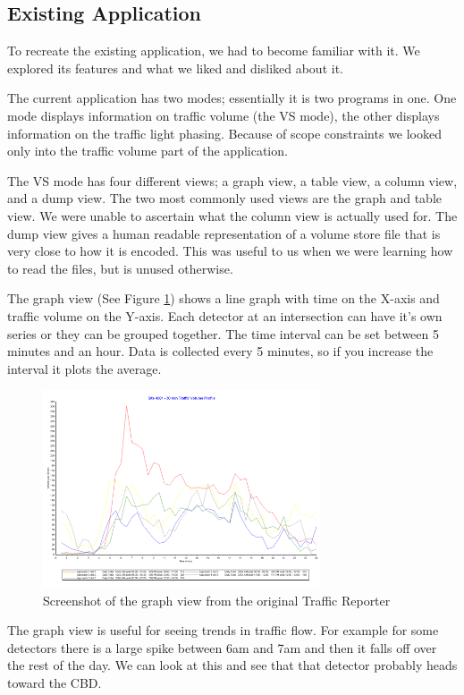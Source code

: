\documentclass{article}
\begin{document}
\subsection{Existing Application}
To recreate the existing application, we had to become
familiar with it. We explored its features and what we liked
and disliked about it.

The current application has two modes; essentially it is two
programs in one. One mode displays information on traffic
volume (the VS mode), the other displays information on the
traffic light phasing. Because of scope constraints we looked
only into the traffic volume part of the application. 

The VS mode has four different views; a graph view, a
table view, a column view, and a dump view. The two most
commonly used views are the graph and table view. We were
unable to ascertain what the column view is actually used for.
The dump view gives a human readable representation of a
volume store file that is very close to how it is encoded. This
was useful to us when we were learning how to read the files,
but is unused otherwise.

The graph view (See Figure \ref{fig:oldGraph}) shows a line graph with time on the X-axis
and traffic volume on the Y-axis. Each detector at an
intersection can have it’s own series or they can be grouped
together. The time interval can be set between 5 minutes and
an hour. Data is collected every 5 minutes, so if you increase
the interval it plots the average.

\begin{figure}[!t]
\centerline{\includegraphics[height=2.3in]{oldGraph}}
\caption{Screenshot of the graph view from the original Traffic Reporter}
\label{fig:oldGraph}
\end{figure}

The graph view is useful for seeing trends in traffic flow.
For example for some detectors there is a large spike between
6am and 7am and then it falls off over the rest of the day. We
can look at this and see that that detector probably heads
toward the CBD.
\end{document}
